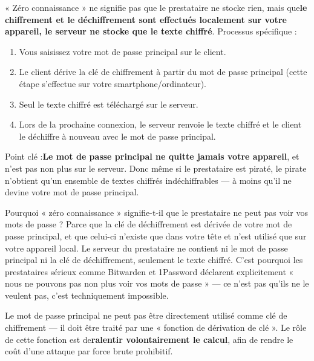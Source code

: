 
« Zéro connaissance » ne signifie pas que le prestataire ne stocke rien, mais que\textbf{le chiffrement et le déchiffrement sont effectués localement sur votre appareil, le serveur ne stocke que le texte chiffré}. Processus spécifique :

\begin{enumerate}
  \item Vous saisissez votre mot de passe principal sur le client.
  \item Le client dérive la clé de chiffrement à partir du mot de passe principal (cette étape s'effectue sur votre smartphone/ordinateur).
  \item Seul le texte chiffré est téléchargé sur le serveur.
  \item Lors de la prochaine connexion, le serveur renvoie le texte chiffré et le client le déchiffre à nouveau avec le mot de passe principal.
\end{enumerate}

Point clé :\textbf{Le mot de passe principal ne quitte jamais votre appareil}, et n'est pas non plus sur le serveur. Donc même si le prestataire est piraté, le pirate n'obtient qu'un ensemble de textes chiffrés indéchiffrables — à moins qu'il ne devine votre mot de passe principal.

\begin{tcbinfo}{Pourquoi « zéro connaissance » signifie-t-il que le prestataire ne peut pas voir vos mots de passe ?}
Parce que la clé de déchiffrement est dérivée de votre mot de passe principal, et que celui-ci n'existe que dans votre tête et n'est utilisé que sur votre appareil local. Le serveur du prestataire ne contient ni le mot de passe principal ni la clé de déchiffrement, seulement le texte chiffré. C'est pourquoi les prestataires sérieux comme Bitwarden et 1Password déclarent explicitement « nous ne pouvons pas non plus voir vos mots de passe » — ce n'est pas qu'ils ne le veulent pas, c'est techniquement impossible.

\end{tcbinfo}


Le mot de passe principal ne peut pas être directement utilisé comme clé de chiffrement — il doit être traité par une « fonction de dérivation de clé ». Le rôle de cette fonction est de\textbf{ralentir volontairement le calcul}, afin de rendre le coût d'une attaque par force brute prohibitif.

